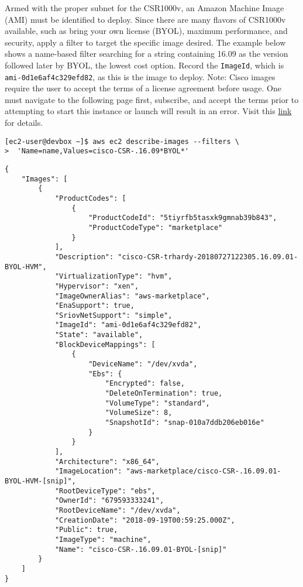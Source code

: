 Armed with the proper subnet for the CSR1000v, an Amazon Machine Image (AMI)
must be identified to deploy. Since there are many flavors of CSR1000v
available, such as bring your own license (BYOL), maximum performance, and
security, apply a filter to target the specific image desired. The example
below shows a name-based filter searching for a string containing 16.09 as the
version followed later by BYOL, the lowest cost option. Record the \verb|ImageId|,
which is \verb|ami-0d1e6af4c329efd82|, as this is the image to deploy.
Note: Cisco images require the user to accept the terms of a license agreement
before usage. One must navigate to the following page first,
subscribe, and accept the terms prior to attempting to start this instance or
launch will result in an error. Visit this
\href{https://aws.amazon.com/marketplace/pp/B00NF48FI2}{link} for details.

\begin{verbatim}
[ec2-user@devbox ~]$ aws ec2 describe-images --filters \
>  'Name=name,Values=cisco-CSR-.16.09*BYOL*'
\end{verbatim}

\begin{verbatim}
{
    "Images": [
        {
            "ProductCodes": [
                {
                    "ProductCodeId": "5tiyrfb5tasxk9gmnab39b843", 
                    "ProductCodeType": "marketplace"
                }
            ], 
            "Description": "cisco-CSR-trhardy-20180727122305.16.09.01-BYOL-HVM", 
            "VirtualizationType": "hvm", 
            "Hypervisor": "xen", 
            "ImageOwnerAlias": "aws-marketplace", 
            "EnaSupport": true, 
            "SriovNetSupport": "simple", 
            "ImageId": "ami-0d1e6af4c329efd82", 
            "State": "available", 
            "BlockDeviceMappings": [
                {
                    "DeviceName": "/dev/xvda", 
                    "Ebs": {
                        "Encrypted": false, 
                        "DeleteOnTermination": true, 
                        "VolumeType": "standard", 
                        "VolumeSize": 8, 
                        "SnapshotId": "snap-010a7ddb206eb016e"
                    }
                }
            ], 
            "Architecture": "x86_64", 
            "ImageLocation": "aws-marketplace/cisco-CSR-.16.09.01-BYOL-HVM-[snip]", 
            "RootDeviceType": "ebs", 
            "OwnerId": "679593333241", 
            "RootDeviceName": "/dev/xvda", 
            "CreationDate": "2018-09-19T00:59:25.000Z", 
            "Public": true, 
            "ImageType": "machine", 
            "Name": "cisco-CSR-.16.09.01-BYOL-[snip]"
        }
    ]
}
\end{verbatim}


